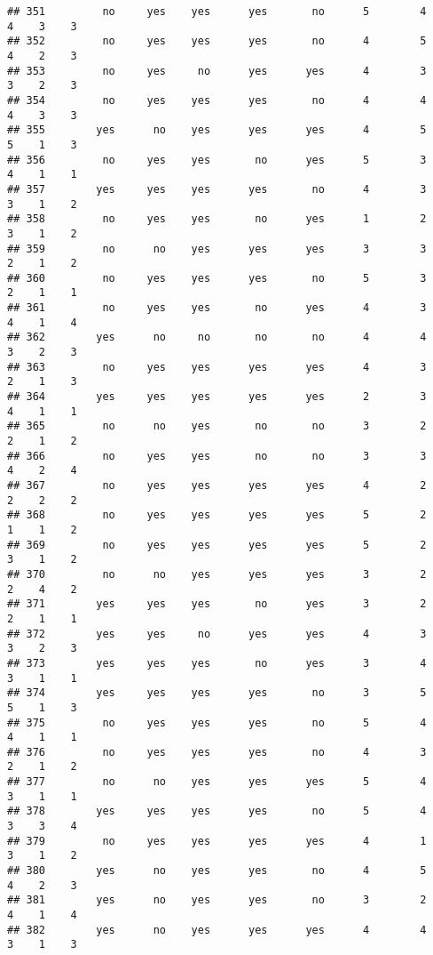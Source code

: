 \documentclass[
]{article}
\begin{document}
\begin{verbatim}
## 351         no     yes    yes      yes       no      5        4     4    3    3
## 352         no     yes    yes      yes       no      4        5     4    2    3
## 353         no     yes     no      yes      yes      4        3     3    2    3
## 354         no     yes    yes      yes       no      4        4     4    3    3
## 355        yes      no    yes      yes      yes      4        5     5    1    3
## 356         no     yes    yes       no      yes      5        3     4    1    1
## 357        yes     yes    yes      yes       no      4        3     3    1    2
## 358         no     yes    yes       no      yes      1        2     3    1    2
## 359         no      no    yes      yes      yes      3        3     2    1    2
## 360         no     yes    yes      yes       no      5        3     2    1    1
## 361         no     yes    yes       no      yes      4        3     4    1    4
## 362        yes      no     no       no       no      4        4     3    2    3
## 363         no     yes    yes      yes      yes      4        3     2    1    3
## 364        yes     yes    yes      yes      yes      2        3     4    1    1
## 365         no      no    yes       no       no      3        2     2    1    2
## 366         no     yes    yes       no       no      3        3     4    2    4
## 367         no     yes    yes      yes      yes      4        2     2    2    2
## 368         no     yes    yes      yes      yes      5        2     1    1    2
## 369         no     yes    yes      yes      yes      5        2     3    1    2
## 370         no      no    yes      yes      yes      3        2     2    4    2
## 371        yes     yes    yes       no      yes      3        2     2    1    1
## 372        yes     yes     no      yes      yes      4        3     3    2    3
## 373        yes     yes    yes       no      yes      3        4     3    1    1
## 374        yes     yes    yes      yes       no      3        5     5    1    3
## 375         no     yes    yes      yes       no      5        4     4    1    1
## 376         no     yes    yes      yes       no      4        3     2    1    2
## 377         no      no    yes      yes      yes      5        4     3    1    1
## 378        yes     yes    yes      yes       no      5        4     3    3    4
## 379         no     yes    yes      yes      yes      4        1     3    1    2
## 380        yes      no    yes      yes       no      4        5     4    2    3
## 381        yes      no    yes      yes       no      3        2     4    1    4
## 382        yes      no    yes      yes      yes      4        4     3    1    3

\end{verbatim}
\end{document}
